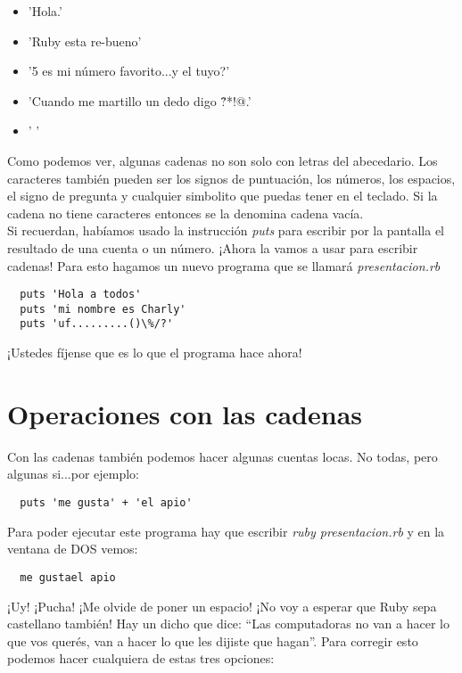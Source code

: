 \begin{itemize}
  \item 'Hola.'
  \item 'Ruby esta re-bueno'
  \item '5 es mi número favorito...y el tuyo?'
  \item 'Cuando me martillo un dedo digo \^?*!@.'
  \item ' '
\end{itemize}

Como podemos ver, algunas cadenas no son solo con letras del abecedario. Los caracteres también pueden ser los signos de puntuación, los números, los espacios, el signo de pregunta y cualquier simbolito que puedas tener en el teclado. Si la cadena no tiene caracteres entonces se la denomina cadena vacía.\\

Si recuerdan, habíamos usado la instrucción \emph{puts} para escribir por la pantalla el resultado de una cuenta o un número. ¡Ahora la vamos a usar para escribir cadenas! Para esto hagamos un nuevo programa que se llamará \emph{presentacion.rb}


\begin{lstlisting}
  puts 'Hola a todos'
  puts 'mi nombre es Charly'
  puts 'uf.........()\%/?'
\end{lstlisting}

¡Ustedes fíjense que es lo que el programa hace ahora!

\section{Operaciones con las cadenas}

Con las cadenas también podemos hacer algunas cuentas locas. No todas, pero algunas si...por ejemplo:

\begin{lstlisting}
  puts 'me gusta' + 'el apio'
\end{lstlisting}

Para poder ejecutar este programa hay que escribir \emph{ruby presentacion.rb} y en la ventana de DOS vemos:
\begin{lstlisting}
  me gustael apio
\end{lstlisting}

¡Uy! ¡Pucha! ¡Me olvide de poner un espacio! ¡No voy a esperar que Ruby sepa castellano también! Hay un dicho que dice: “Las computadoras no van a hacer lo que vos querés, van a hacer lo que les dijiste que hagan”. Para corregir esto podemos hacer cualquiera de estas tres opciones:

